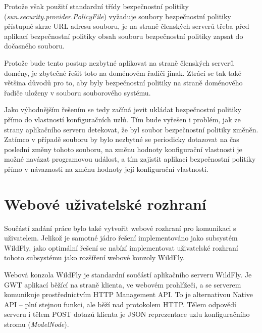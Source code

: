 Protože však použití standardní třídy bezpečnostní politiky ({\it sun.security.provider.PolicyFile}) vyžaduje soubory bezpečnostní politiky přístupné skrze URL adresu souboru, je na straně členských serverů třeba před aplikací bezpečnostní politiky obsah souboru bezpečnostní politiky zapsat do dočasného souboru.

Protože bude tento postup nezbytné aplikovat na straně členských serverů domény, je zbytečné řešit toto na doménovém řadiči jinak. Ztrácí se tak také většina důvodů pro to, aby byly bezpečnostní politiky na straně doménového řadiče uloženy v souboru souborového systému.

Jako výhodnějším řešením se tedy začíná jevit ukládat bezpečnostní politiky přímo do vlastností konfiguračních uzlů. Tím bude vyřešen i problém, jak ze strany aplikačního serveru detekovat, že byl soubor bezpečnostní politiky změněn. Zatímco v případě souboru by bylo nezbytné se periodicky dotazovat na čas poslední změny tohoto souboru, na změnu hodnoty konfigurační vlastnosti je možné navázat programovou událost, a tím zajistit aplikaci bezpečnostní politiky přímo v návaznosti na změnu hodnoty její konfigurační vlastnosti.

\section{Webové uživatelské rozhraní} \label{navrhGUI}

Součástí zadání práce bylo také vytvořit webové rozhraní pro komunikaci s uživatelem. Jelikož je samotné jádro řešení implementováno jako subsystém WildFly, jako optimální řešení se nabízí implementovat uživatelské rozhraní tohoto subsystému jako rozšíření webové konzoly WildFly.

Webová konzola WildFly je standardní součástí aplikačního serveru WildFly. Je GWT aplikací běžící na straně klienta, ve webovém prohlížeči, a se serverem komunikuje prostřednictvím HTTP Management API. To je alternativou Native API -- plní stejnou funkci, ale běží nad protokolem HTTP. Tělem odpovědí serveru i tělem POST dotazů klienta je JSON reprezentace uzlu konfiguračního stromu ({\it ModelNode}). \cite{WildFlyManagementAPIreference}

